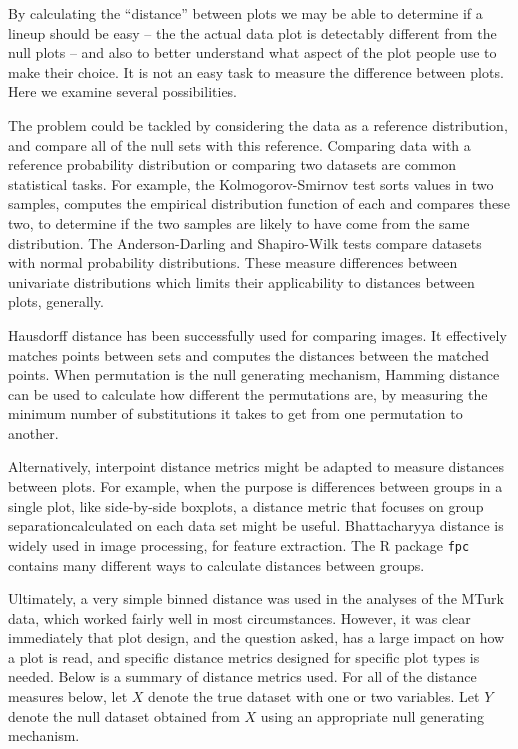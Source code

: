 \documentclass[12]{article}
\begin{document}
By calculating the ``distance'' between plots we may be able to determine if a lineup should be easy -- the the actual data plot is detectably different from the null plots -- and also to better understand what aspect of the plot people use to make their choice. It is not an easy task to measure the difference between plots. Here we examine several possibilities. 

The problem could be tackled by considering the data as a reference distribution, and compare all of the null sets with this reference. Comparing data with a reference probability distribution or comparing two datasets are common statistical tasks. For example, the Kolmogorov-Smirnov test \citep{stephens:1974} sorts values in two samples, computes the empirical distribution function of each and compares these two, to determine if the two samples are likely to have come from the same distribution.  The Anderson-Darling \citep{stephens:1974} and Shapiro-Wilk \citep{shapiro:1965} tests compare datasets with normal probability distributions. These measure differences between univariate distributions which limits their applicability to distances between plots, generally. 

Hausdorff distance \citep{huttenlocher:1993} has been successfully used for comparing images. It effectively matches points between sets and computes the distances between the matched points. When permutation is the null generating mechanism, Hamming distance \citep{hamming:1950} can be used to calculate how different the permutations are, by measuring the minimum number of substitutions it takes to get from one permutation to another. 

Alternatively, interpoint distance metrics might be adapted to measure distances between plots. For example, when the purpose is differences between groups in a single plot, like side-by-side boxplots, a distance metric that focuses on group separationcalculated on each data set might be useful. Bhattacharyya distance \citep{bhattacharyya:1946} is widely used in image processing, for feature extraction. The R package {\tt fpc} \cite{hennig:2010} contains many different ways to calculate distances between groups. 

Ultimately, a very simple binned distance was used in the analyses of the MTurk data, which worked fairly well in most circumstances. However, it was clear immediately that plot design, and the question asked, has a large impact on how a plot is read, and specific distance metrics designed for specific plot types is needed. Below is a summary of distance metrics used. For all of the distance measures below, let $X$ denote the true dataset with one or two variables. Let $Y$ denote the null dataset obtained from $X$ using an appropriate null generating mechanism.
\end{document}
